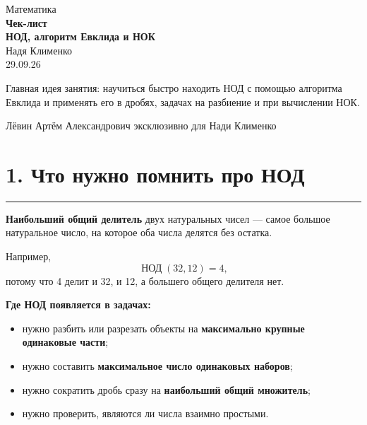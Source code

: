 \documentclass[a4paper,12pt]{article}
\newcommand{\nodr}{\mathop{\text{НОД}}\nolimits}
\newcommand{\key}[1]{\textcolor{darkaccent}{\textbf{#1}}}
\newcommand{\sectionrule}{\vspace{-2mm}\par\noindent\textcolor{linegray}{\rule{\linewidth}{0.5pt}}\par\vspace{1mm}}
\begin{document}
\thispagestyle{empty}
\begin{center}
\vspace*{28mm}
{\Large\textcolor{darkaccent}{Математика}}\\[9mm]
{\Huge\bfseries Чек-лист}\\[5mm]
{\LARGE\bfseries НОД, алгоритм Евклида и НОК}\\[15mm]
{\large Надя Клименко}\\[4mm]
{\normalsize 29.09.26}\\[22mm]
\begin{minipage}{0.78\textwidth}
\centering
\large
Главная идея занятия: научиться быстро находить НОД с помощью алгоритма Евклида и применять его в дробях, задачах на разбиение и при вычислении НОК.
\end{minipage}
\vfill
{\small Лёвин Артём Александрович эксклюзивно для Нади Клименко}
\end{center}

\clearpage

\section*{1. Что нужно помнить про НОД}
\sectionrule
\key{Наибольший общий делитель} двух натуральных чисел --- самое большое натуральное число, на которое оба числа делятся без остатка.

Например,
\[
\nodr(32,12)=4,
\]
потому что 4 делит и 32, и 12, а большего общего делителя нет.

\textbf{Где НОД появляется в задачах:}
\begin{itemize}
  \item нужно разбить или разрезать объекты на \key{максимально крупные одинаковые части};
  \item нужно составить \key{максимальное число одинаковых наборов};
  \item нужно сократить дробь сразу на \key{наибольший общий множитель};
  \item нужно проверить, являются ли числа взаимно простыми.
\end{itemize}
\end{document}
